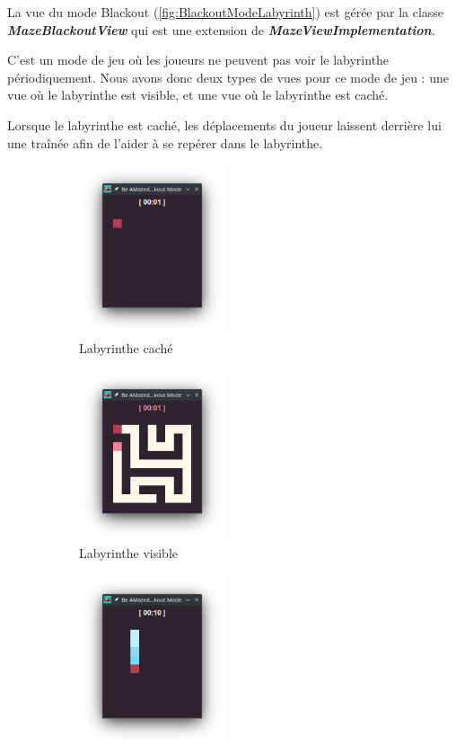 La vue du mode Blackout (\ref{fig:BlackoutModeLabyrinth}) est gérée par la classe \textbf{\textit{MazeBlackoutView}} qui est une extension de \textbf{\textit{MazeViewImplementation}}.

C'est un mode de jeu où les joueurs ne peuvent pas voir le labyrinthe périodiquement. Nous avons donc deux types de vues pour ce mode de jeu : une vue où le labyrinthe est visible, et une vue où le labyrinthe est caché.

Lorsque le labyrinthe est caché, les déplacements du joueur laissent derrière lui une traînée afin de l'aider à se repérer dans le labyrinthe.

\begin{figure}[!htb]%
    \centering
    \begin{subfigure}{4.3cm}
        \includegraphics[width=4.3cm]{ressources/Implementation/Labyrinthe/Vue/Blackout/BlackoutDark.png}%
        \caption{Labyrinthe caché}
        \label{fig:HiddenLabyrinth}
    \end{subfigure}
    \qquad
    \begin{subfigure}{4.3cm}
        \includegraphics[width=4.3cm]{ressources/Implementation/Labyrinthe/Vue/Blackout/BlackoutLight.png}%
        \caption{Labyrinthe visible}
        \label{fig:VisibleLabyrinth}
    \end{subfigure}
    \qquad
    \begin{subfigure}{4.3cm}
        \includegraphics[width=4.3cm]{ressources/Implementation/Labyrinthe/Vue/Blackout/BlackoutDarkParticles.png}%

\end{subfigure}
\end{figure}

